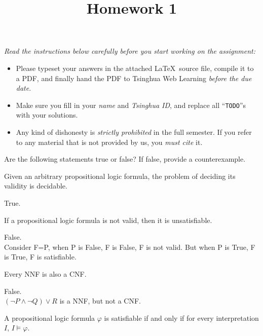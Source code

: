 \documentclass[11pt,a4paper]{article}
\title{Homework 1}
\begin{document}
	
	\maketitle
	
	\textit{Read the instructions below carefully before you start working on the assignment:}
	\begin{itemize}
		\item Please typeset your answers in the attached \LaTeX~source file, compile it to a PDF,
		and finally hand the PDF to Tsinghua Web Learning \emph{before the due date}.
		\item Make sure you fill in your \emph{name} and \emph{Tsinghua ID},
		and replace all ``\texttt{TODO}''s with your solutions.
		\item Any kind of dishonesty is \emph{strictly prohibited} in the full semester.
		If you refer to any material that is not provided by us, you \emph{must cite} it.
	\end{itemize}
	
	
	
	Are the following statements true or false? If false, provide a counterexample.
	
	\subproblem Given an arbitrary propositional logic formula, the problem of deciding its validity is decidable.
	
	\begin{solution}
		True.
	\end{solution}
	
	\subproblem If a propositional logic formula is not valid, then it is unsatisfiable.
	
	\begin{solution}
		False.\\
		Consider F=P, when P is False, F is False, F is not valid. But when P is True, F is True, F is satisfiable.
		
	\end{solution}
	
	\subproblem Every NNF is also a CNF.
	
	\begin{solution}
		False.\\
		$(\lnot P \land \lnot Q)\lor R$ is a NNF, but not a CNF.
	\end{solution}
	
	\subproblem A propositional logic formula $\varphi$ is satisfiable if and only if for every interpretation $I$,
	$I \models \varphi$.
	
\end{document}
